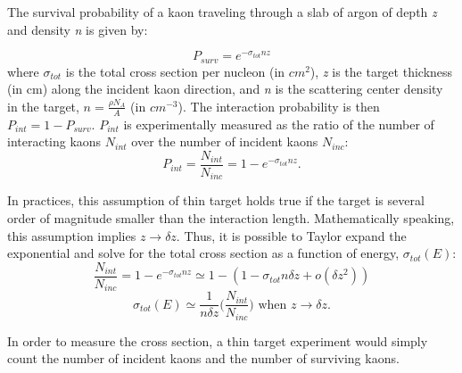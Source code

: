  The survival probability of a kaon traveling through a slab of argon of depth {\it z} and density {\it n} is given by:

\begin{equation}
P_{surv} = e^{-\sigma_{tot}n z}
\end{equation} 
where $\sigma_{tot}$ is the total cross section per nucleon (in $cm^2$), {\textit
{z}} is the target thickness (in cm) along the incident kaon direction, and {\textit
{n}} is the scattering center density in the target, $n=\frac{\rho N_{A} }{A}$ (in $cm^{-3}$). The interaction probability is then $P_{int} = 1 - P_{surv}$. $P_{int}$ is experimentally measured as the ratio of the number of interacting kaons $N_{int}$ over the number of incident kaons $N_{inc}$:
\begin{equation}
P_{int}=\frac{N_{int}}{N_{inc}}=1-e^{-\sigma_{tot}n z}.
\end{equation}

In practices, this assumption of thin target holds true if the target is several order of magnitude smaller than the interaction length. Mathematically speaking, this assumption implies $z\rightarrow\delta z$. Thus, it is possible to Taylor expand the exponential and  solve for the total cross section as a function of energy, $\sigma_{tot}(E)$:
\begin{equation}\label{calc_sigma1}
\frac{N_{int}}{N_{inc}}=1-e^{-\sigma_{tot}n z}\simeq 1-(1-\sigma_{tot}n\delta z + o(\delta z^2)) 
\end{equation}
\begin{equation}\label{calc_sigma2}
\sigma_{tot}(E) \simeq \frac{1}{n\delta z} \Big(\frac{N_{int}}{N_{inc}}\Big) \text{ 	when $z\rightarrow\delta z$}.
\end{equation}

In order to measure the cross section, a thin target experiment would simply count the number of incident kaons and the number of surviving kaons.

